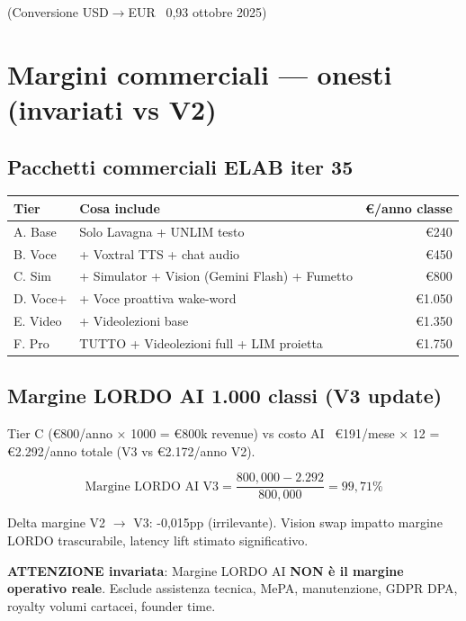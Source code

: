 \documentclass[12pt,a4paper]{article}
\begin{document}
(Conversione USD\(\rightarrow\)EUR ~0,93 ottobre 2025)

\section{Margini commerciali --- onesti (invariati vs V2)}

\subsection*{Pacchetti commerciali ELAB iter 35}

\begin{center}
\begin{tabular}{llr}
\toprule
\textbf{Tier} & \textbf{Cosa include} & \textbf{€/anno classe} \\
\midrule
A. Base       & Solo Lavagna + UNLIM testo                    & €240 \\
B. Voce       & + Voxtral TTS + chat audio                    & €450 \\
C. Sim        & + Simulator + Vision (Gemini Flash) + Fumetto & €800 \\
D. Voce+      & + Voce proattiva wake-word                    & €1.050 \\
E. Video      & + Videolezioni base                           & €1.350 \\
F. Pro        & TUTTO + Videolezioni full + LIM proietta      & €1.750 \\
\bottomrule
\end{tabular}
\end{center}

\subsection*{Margine LORDO AI 1.000 classi (V3 update)}

Tier C (€800/anno × 1000 = €800k revenue) vs costo AI ~€191/mese × 12 = €2.292/anno totale (V3 vs €2.172/anno V2).

\begin{equation*}
\text{Margine LORDO AI V3} = \frac{800{,}000 - 2.292}{800{,}000} = 99{,}71\%
\end{equation*}

Delta margine V2 \(\rightarrow\) V3: -0,015pp (irrilevante). Vision swap impatto margine LORDO trascurabile, latency lift stimato significativo.

\textbf{ATTENZIONE invariata}: Margine LORDO AI \textbf{NON è il margine operativo reale}. Esclude assistenza tecnica, MePA, manutenzione, GDPR DPA, royalty volumi cartacei, founder time.
\end{document}
